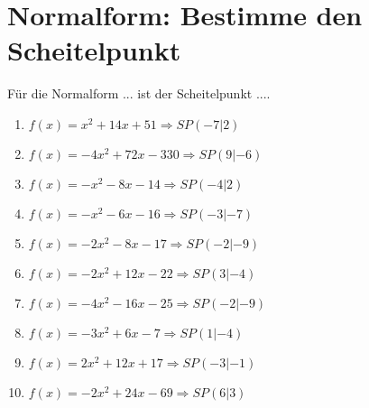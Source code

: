 \documentclass{article}%
\begin{document}
\section{Normalform: Bestimme den Scheitelpunkt}%
\label{sec:NormalformBestimmedenScheitelpunkt}%
Für die Normalform ... ist der Scheitelpunkt ....%
\begin{enumerate}[label=\alph*)]%
\item%
\newline\vspace{0.5cm}$f(x)=x^2 + 14x + 51 \Rightarrow SP(-7|2) $%
\item%
\newline\vspace{0.5cm}$f(x)=-4x^2 + 72x - 330 \Rightarrow SP(9|-6) $%
\item%
\newline\vspace{0.5cm}$f(x)=-x^2 - 8x - 14 \Rightarrow SP(-4|2) $%
\item%
\newline\vspace{0.5cm}$f(x)=-x^2 - 6x - 16 \Rightarrow SP(-3|-7) $%
\item%
\newline\vspace{0.5cm}$f(x)=-2x^2 - 8x - 17 \Rightarrow SP(-2|-9) $%
\item%
\newline\vspace{0.5cm}$f(x)=-2x^2 + 12x - 22 \Rightarrow SP(3|-4) $%
\item%
\newline\vspace{0.5cm}$f(x)=-4x^2 - 16x - 25 \Rightarrow SP(-2|-9) $%
\item%
\newline\vspace{0.5cm}$f(x)=-3x^2 + 6x - 7 \Rightarrow SP(1|-4) $%
\item%
\newline\vspace{0.5cm}$f(x)=2x^2 + 12x + 17 \Rightarrow SP(-3|-1) $%
\item%
\newline\vspace{0.5cm}$f(x)=-2x^2 + 24x - 69 \Rightarrow SP(6|3) $%
\end{enumerate}

%
\end{document}
